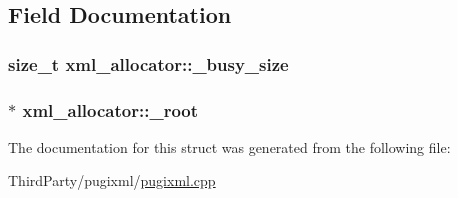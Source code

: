 \subsection{Field Documentation}
\hypertarget{structxml__allocator_a4908b4aaa8cbbc3bf936ab8a938053c0}{
\subsubsection[{\-\_\-busy\-\_\-size}]{\setlength{\rightskip}{0pt plus 5cm}size\-\_\-t xml\-\_\-allocator\-::\-\_\-busy\-\_\-size}}\label{structxml__allocator_a4908b4aaa8cbbc3bf936ab8a938053c0}
\hypertarget{structxml__allocator_a38082e85b23743620a257f997a00bb69}{
\subsubsection[{\-\_\-root}]{$\ast$ xml\-\_\-allocator\-::\-\_\-root}}\label{structxml__allocator_a38082e85b23743620a257f997a00bb69}


The documentation for this struct was generated from the following file\-:\begin{DoxyCompactItemize}
\item 
Third\-Party/pugixml/\hyperlink{pugixml_8cpp}{pugixml.\-cpp}\end{DoxyCompactItemize}
